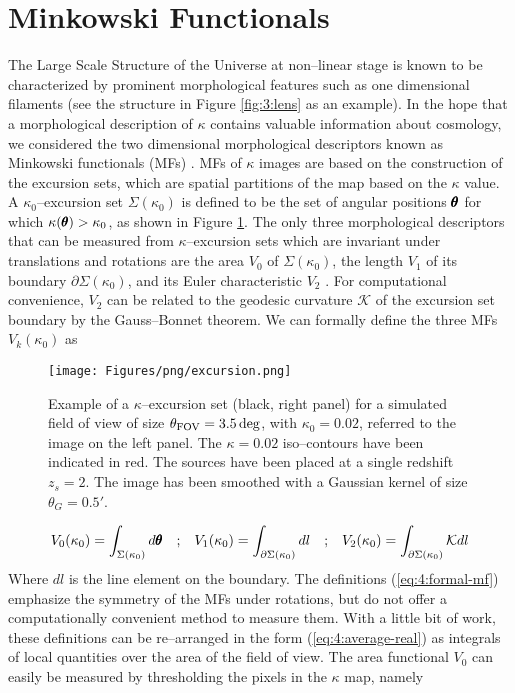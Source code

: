 
\section{Minkowski Functionals}
\label{sec:4:mink}
The Large Scale Structure of the Universe at non--linear stage is known to be characterized by prominent morphological features such as one dimensional filaments (see the structure in Figure \ref{fig:3:lens} as an example). In the hope that a morphological description of $\kappa$ contains valuable information about cosmology, we considered the two dimensional morphological descriptors known as Minkowski functionals (MFs) \citep{Tomita,MatsubaraLong}. MFs of $\kappa$ images are based on the construction of the excursion sets, which are spatial partitions of the map based on the $\kappa$ value. A $\kappa_0$--excursion set $\Sigma(\kappa_0)$ is defined to be the set of angular positions $\pmb{\theta}$ for which $\kappa(\pmb{\theta})>\kappa_0$, as shown in Figure \ref{fig:4:excursion}. The only three morphological descriptors that can be measured from $\kappa$--excursion sets which are invariant under translations and rotations are the area $V_0$ of $\Sigma(\kappa_0)$, the length $V_1$ of its boundary $\partial\Sigma(\kappa_0)$, and its Euler characteristic $V_2$ \citep{MatsubaraLong}. For computational convenience, $V_2$ can be related to the geodesic curvature $\mathcal{K}$ of the excursion set boundary by the Gauss--Bonnet theorem. We can formally define the three MFs $V_k(\kappa_0)$ as 
%
\begin{figure}
\begin{center}
\texttt{[image: Figures/png/excursion.png]}
\end{center}
\caption{Example of a $\kappa$--excursion set (black, right panel) for a simulated field of view of size $\theta_{\rm FOV}=3.5\,{\rm deg}$, with $\kappa_0=0.02$, referred to the image on the left panel. The $\kappa=0.02$ iso--contours have been indicated in red. The sources have been placed at a single redshift $z_s=2$. The image has been smoothed with a Gaussian kernel of size $\theta_G=0.5'$.}
\label{fig:4:excursion}
\end{figure}
%
\begin{equation}
\label{eq:4:formal-mf}
\begin{matrix}
\displaystyle V_0(\kappa_0) = \int_{\Sigma(\kappa_0)} d\pmb{\theta} & ; & \displaystyle V_1(\kappa_0) = \int_{\partial\Sigma(\kappa_0)} dl & ; & \displaystyle V_2(\kappa_0) = \int_{\partial\Sigma(\kappa_0)}\mathcal{K}dl
\end{matrix}
\end{equation}   
%
Where $dl$ is the line element on the boundary. The definitions (\ref{eq:4:formal-mf}) emphasize the symmetry of the MFs under rotations, but do not offer a computationally convenient method to measure them. With a little bit of work, these definitions can be re--arranged in the form (\ref{eq:4:average-real}) as integrals of local quantities over the area of the field of view. The area functional $V_0$ can easily be measured by thresholding the pixels in the $\kappa$ map, namely

